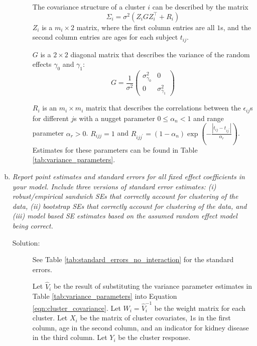 \documentclass[11pt, letterpaper]{article}
\begin{document}
\begin{enumerate}[(a)]
\begin{description}
  The covariance structure of a cluster $i$ can be described by the matrix
  \begin{equation}
    \Sigma_i = \sigma^2\left(Z_iGZ_i^\intercal + R_i\right)
    \label{eqn:cluster_covariance}
  \end{equation}
  $Z_i$ is a $m_i \times 2$ matrix, where the first column entries are all $1$s,
  and the second column entries are ages for each subject $t_{ij}$.

  $G$ is a $2 \times 2$ diagonal matrix that describes the variance of the
  random effects $\gamma_0$ and $\gamma_1$:
  \begin{equation}
    G = \frac{1}{\sigma^2}\begin{pmatrix}
      \sigma^2_{\gamma_0} & 0 \\
      0 & \sigma^2_{\gamma_1}
    \end{pmatrix}
    \label{eqn:random_effects_covariance}
  \end{equation}

  $R_i$ is an $m_i \times m_i$ matrix that describes the correlations between
  the $\epsilon_{ij}$s for different $j$s with a nugget parameter
  $0 \leq \alpha_n < 1$ and range parameter $\alpha_r > 0$. $R_{ijj} = 1$ and
  $R_{ijj^\prime} = \left(1 - \alpha_n\right) \exp\left(-\frac{\left\lvert
        t_{ij} - t_{ij^\prime}\right\rvert}{\alpha_r}\right)$. Estimates for
  these parameters can be found in Table \ref{tab:variance_parameters}.
\end{description}

\item {\em  Report point estimates and standard errors for all fixed effect
coefficients in your model.  Include three versions of standard error estimates: (i) robust/empirical sandwich SEs that correctly
account for clustering of the data, (ii) bootstrap SEs that correctly account for clustering of the data, and (iii) model based SE estimates based on the assumed random effect model being correct.}



\begin{description}
\item[Solution:] See Table \ref{tab:standard_errors_no_interaction} for the
  standard errors.

  Let $\hat{V}_i$ be the result of substituting the variance parameter estimates
  in Table \ref{tab:variance_parameters} into Equation
  \ref{eqn:cluster_covariance}. Let $W_i = \hat{V}_i^{-1}$ be the weight matrix
  for each cluster. Let $X_i$ be the matrix of cluster covariates, $1$s in the
  first column, age in the second column, and an indicator for kidney disease in
  the third column. Let $Y_i$ be the cluster response.


\end{description}
\end{enumerate}
\end{document}
